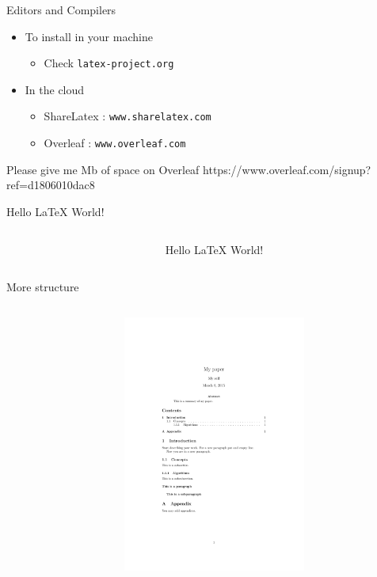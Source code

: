 \documentclass{beamer}
\begin{document}
\begin{frame}{Editors and Compilers}
\begin{itemize}
\item To install in your machine
\begin{itemize}
\item Check \texttt{latex-project.org}
\end{itemize}
\pause
\item In the cloud
\begin{itemize}
\item ShareLatex : \texttt{www.sharelatex.com}
\item Overleaf : \texttt{www.overleaf.com}
\end{itemize}
\end{itemize}
\pause
\vskip 1cm
\begin{block}{Please give me Mb of space on Overleaf}
https://www.overleaf.com/signup?ref=d1806010dac8
\end{block}
\end{frame}

\begin{frame}[fragile]{Hello \LaTeX{} World!}
\begin{columns}
\begin{column}{5cm}
\vspace{-2cm}

\end{column}
\begin{column}{5cm}
Hello \LaTeX{} World!
\end{column}
\end{columns}
\end{frame}

\begin{frame}[fragile]{More structure}
\begin{columns}
\begin{column}{5.5cm}

\end{column}
\begin{column}{4.5cm}
\vspace{-2cm}
\begin{figure}
\includegraphics[width=6cm]{file2a.pdf}
\end{figure}
\end{column}
\end{columns}
\end{frame}
\end{document}
